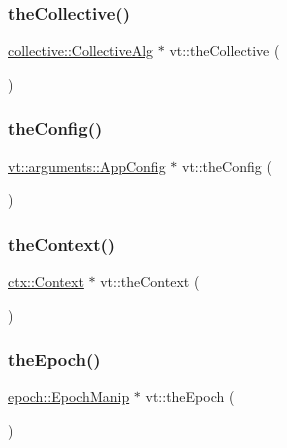 \mbox{\label{namespacevt_aa8e0c0ab253e7ad1acd5d09e36fea769}} 
\subsubsection{\texorpdfstring{the\+Collective()}{theCollective()}}
{\footnotesize\ttfamily \hyperlink{structvt_1_1collective_1_1_collective_alg}{collective\+::\+Collective\+Alg} $\ast$ vt\+::the\+Collective (\begin{DoxyParamCaption}{ }\end{DoxyParamCaption})}

\mbox{\label{namespacevt_aa17c6eae35e7e41a8b11d4047b7c0839}} 
\subsubsection{\texorpdfstring{the\+Config()}{theConfig()}}
{\footnotesize\ttfamily \hyperlink{structvt_1_1arguments_1_1_app_config}{vt\+::arguments\+::\+App\+Config} $\ast$ vt\+::the\+Config (\begin{DoxyParamCaption}{ }\end{DoxyParamCaption})}

\mbox{\label{namespacevt_a26551fe0e6e6a1371111df5b12c7e92c}} 
\subsubsection{\texorpdfstring{the\+Context()}{theContext()}}
{\footnotesize\ttfamily \hyperlink{structvt_1_1ctx_1_1_context}{ctx\+::\+Context} $\ast$ vt\+::the\+Context (\begin{DoxyParamCaption}{ }\end{DoxyParamCaption})}

\mbox{\label{namespacevt_ad246530e523687095c567ccab203556a}} 
\subsubsection{\texorpdfstring{the\+Epoch()}{theEpoch()}}
{\footnotesize\ttfamily \hyperlink{structvt_1_1epoch_1_1_epoch_manip}{epoch\+::\+Epoch\+Manip} $\ast$ vt\+::the\+Epoch (\begin{DoxyParamCaption}{ }\end{DoxyParamCaption})}

